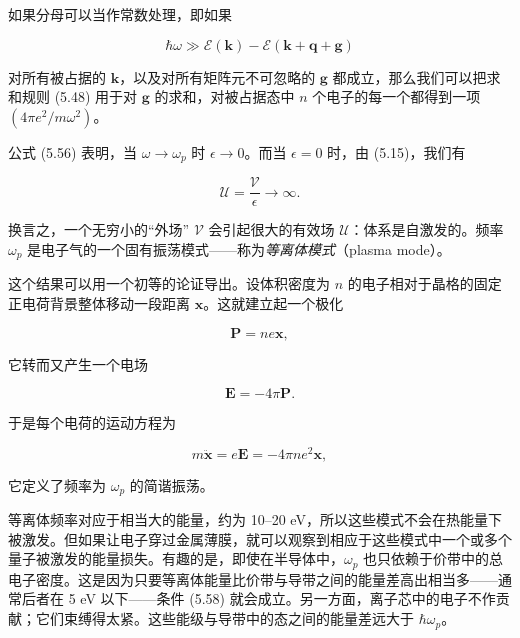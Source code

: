 如果分母可以当作常数处理，即如果

\begin{equation*}
\hbar\omega \gg \mathcal{E}(\mathbf{k}) - \mathcal{E}(\mathbf{k}+\mathbf{q}+\mathbf{g})
\tag{5.58}
\end{equation*}

对所有被占据的 $\mathbf{k}$，以及对所有矩阵元不可忽略的 $\mathbf{g}$ 都成立，那么我们可以把求和规则 (5.48) 用于对 $\mathbf{g}$ 的求和，对被占据态中 $n$ 个电子的每一个都得到一项 $(4\pi e^2/m\omega^2)$。

公式 (5.56) 表明，当 $\omega \to \omega_p$ 时 $\epsilon \to 0$。而当 $\epsilon = 0$ 时，由 (5.15)，我们有

\begin{equation*}
\mathcal{U} = \frac{\mathcal{V}}{\epsilon} \to \infty .
\tag{5.59}
\end{equation*}

换言之，一个无穷小的“外场” $\mathcal{V}$ 会引起很大的有效场 $\mathcal{U}$：体系是自激发的。频率 $\omega_p$ 是电子气的一个固有振荡模式——称为\emph{等离体模式}（plasma mode）。

这个结果可以用一个初等的论证导出。设体积密度为 $n$ 的电子相对于晶格的固定正电荷背景整体移动一段距离 $\mathbf{x}$。这就建立起一个极化

\begin{equation*}
\mathbf{P} = ne\mathbf{x},
\tag{5.60}
\end{equation*}

它转而又产生一个电场

\begin{equation*}
\mathbf{E} = -4\pi\mathbf{P} .
\tag{5.61}
\end{equation*}

于是每个电荷的运动方程为

\begin{equation*}
m\ddot{\mathbf{x}} = e\mathbf{E} = -4\pi n e^2 \mathbf{x},
\tag{5.62}
\end{equation*}

它定义了频率为 $\omega_p$ 的简谐振荡。

等离体频率对应于相当大的能量，约为 10–20 eV，所以这些模式不会在热能量下被激发。但如果让电子穿过金属薄膜，就可以观察到相应于这些模式中一个或多个量子被激发的能量损失。有趣的是，即使在半导体中，$\omega_p$ 也只依赖于价带中的总电子密度。这是因为只要等离体能量比价带与导带之间的能量差高出相当多——通常后者在 5 eV 以下——条件 (5.58) 就会成立。另一方面，离子芯中的电子不作贡献；它们束缚得太紧。这些能级与导带中的态之间的能量差远大于 $\hbar\omega_p$。

